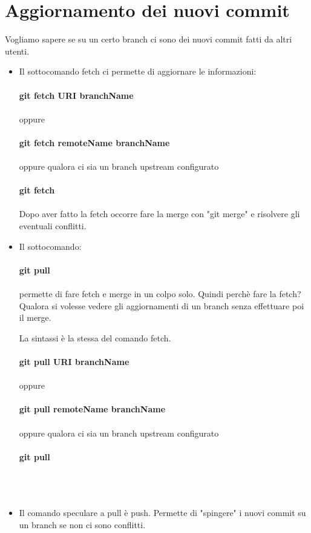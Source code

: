 \documentclass[a4paper,12pt]{report}
\begin{document}
\section{Aggiornamento dei nuovi commit}
Vogliamo sapere se su un certo branch ci sono dei nuovi commit fatti da altri utenti.
\begin{itemize}


\item Il sottocomando fetch ci permette di aggiornare le informazioni:
\\\\
\textbf{git fetch URI branchName}
\\\\
oppure
\\\\
\textbf{git fetch remoteName branchName}
\\\\
oppure qualora ci sia un branch upstream configurato
\\\\
\textbf{git fetch}
\\\\
Dopo aver fatto la fetch occorre fare la merge con "git merge" e risolvere gli eventuali conflitti.
\\
\item Il sottocomando:
\\\\
\textbf{git pull}
\\\\
permette di fare fetch e merge in un colpo solo.
Quindi perchè fare la fetch? Qualora si volesse vedere gli aggiornamenti di un branch senza effettuare poi il merge.

La sintassi è la stessa del comando fetch.
\\\\
\textbf{git pull URI branchName}
\\\\
oppure
\\\\
\textbf{git pull remoteName branchName}
\\\\
oppure qualora ci sia un branch upstream configurato
\\\\
\textbf{git pull}
\\\\
\\\\
\item Il comando speculare a pull è push. Permette di "spingere" i nuovi commit su un branch se non ci sono conflitti.


\end{itemize}
\end{document}
